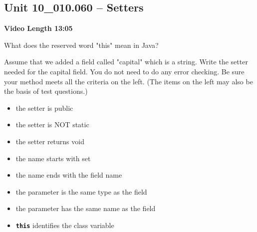 \documentclass[letterpaper,12pt]{exam}
\newcommand{\unit}{Unit 10}
\begin{document}
\begin{questions}
\section*{\unit\_010.060 -- Setters} 
\par{\selectfont\textbf{Video Length 13:05}}

\begin{samepage}
    \question What does the reserved word "this" mean in Java?
    \vspace{5mm}
\end{samepage}

\begin{samepage}
    \question Assume that we added a field called "capital" which is a string.  Write the setter needed for the capital field.  You do not need to do any error checking.  Be sure your method meets all the criteria on the left. (The items on the left may also be the basis of test questions.)
    \begin{itemize}
        \item the setter is public
        \item the setter is NOT static
        \item the setter returns void
        \item the name starts with set
        \item the name ends with the field name
        \item the parameter is the same type as the field
        \item the parameter has the same name as the field
        \item \texttt{\textbf{this}} identifies the class variable
    \end{itemize}
    \vspace{5mm}
\end{samepage}


\end{questions}
\end{document}
